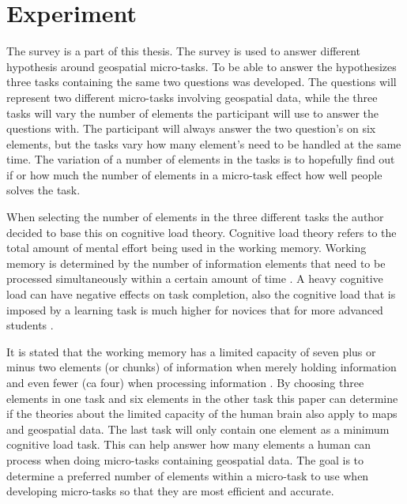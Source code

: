 \section{Experiment}\label{sec:survey}
The survey is a part of this thesis. The survey is used to answer different hypothesis around geospatial micro-tasks. To be able to answer the hypothesizes three tasks containing the same two questions was developed. The questions will represent two different micro-tasks involving geospatial data, while the three tasks will vary the number of elements the participant will use to answer the questions with. The participant will always answer the two question's on six elements, but the tasks vary how many element's need to be handled at the same time. The variation of a number of elements in the tasks is to hopefully find out if or how much the number of elements in a micro-task effect how well people solves the task. 

When selecting the number of elements in the three different tasks the author decided to base this on cognitive load theory. Cognitive load theory refers to the total amount of mental effort being used in the working memory. Working memory is determined by the number of information elements that need to be processed simultaneously within a certain amount of time \citep{Barrouillet2007}. A heavy cognitive load can have negative effects on task completion, also the cognitive load that is imposed by a learning task is much higher for novices that for more advanced students \citep{Leppink2014a}.  

It is stated that the working memory has a limited capacity of seven plus or minus two elements (or chunks) of information when merely holding information and even fewer (ca four) when processing information \citep{Leppink2014a}. By choosing three elements in one task and six elements in the other task this paper can determine if the theories about the limited capacity of the human brain also apply to maps and geospatial data. The last task will only contain one element as a minimum cognitive load task. This can help answer how many elements a human can process when doing micro-tasks containing geospatial data. The goal is to determine a preferred number of elements within a micro-task to use when developing micro-tasks so that they are most efficient and accurate.


